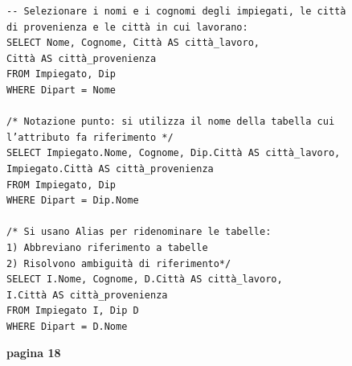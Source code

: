 \documentclass[a4paper,12pt, oneside]{book}
\begin{document}
\begin{verbatim}
-- Selezionare i nomi e i cognomi degli impiegati, le città
di provenienza e le città in cui lavorano:
SELECT Nome, Cognome, Città AS città_lavoro,
Città AS città_provenienza
FROM Impiegato, Dip
WHERE Dipart = Nome

/* Notazione punto: si utilizza il nome della tabella cui
l’attributo fa riferimento */
SELECT Impiegato.Nome, Cognome, Dip.Città AS città_lavoro,
Impiegato.Città AS città_provenienza
FROM Impiegato, Dip
WHERE Dipart = Dip.Nome

/* Si usano Alias per ridenominare le tabelle:
1) Abbreviano riferimento a tabelle
2) Risolvono ambiguità di riferimento*/
SELECT I.Nome, Cognome, D.Città AS città_lavoro,
I.Città AS città_provenienza
FROM Impiegato I, Dip D
WHERE Dipart = D.Nome
\end{verbatim}
\textbf{pagina 18}
\end{document}
